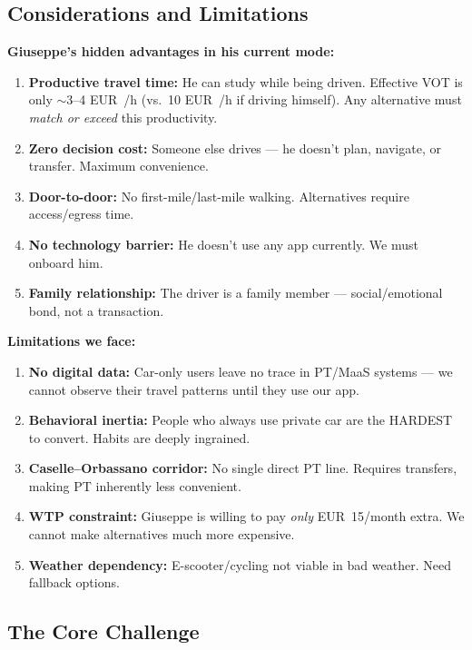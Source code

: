 \documentclass[11pt,a4paper]{article}
\begin{document}
\subsection{Considerations and Limitations}

\begin{tcolorbox}[colback=lightyellow,colframe=deeporange,title=\textbf{What We Must Consider}]
\textbf{Giuseppe's hidden advantages in his current mode:}
\begin{enumerate}[noitemsep]
    \item \textbf{Productive travel time:} He can study while being driven. Effective VOT is only $\sim$3--4 EUR~/h (vs.\ 10 EUR~/h if driving himself). Any alternative must \textit{match or exceed} this productivity.
    \item \textbf{Zero decision cost:} Someone else drives --- he doesn't plan, navigate, or transfer. Maximum convenience.
    \item \textbf{Door-to-door:} No first-mile/last-mile walking. Alternatives require access/egress time.
    \item \textbf{No technology barrier:} He doesn't use any app currently. We must onboard him.
    \item \textbf{Family relationship:} The driver is a family member --- social/emotional bond, not a transaction.
\end{enumerate}

\textbf{Limitations we face:}
\begin{enumerate}[noitemsep]
    \item \textbf{No digital data:} Car-only users leave no trace in PT/MaaS systems --- we cannot observe their travel patterns until they use our app.
    \item \textbf{Behavioral inertia:} People who always use private car are the HARDEST to convert. Habits are deeply ingrained.
    \item \textbf{Caselle--Orbassano corridor:} No single direct PT line. Requires transfers, making PT inherently less convenient.
    \item \textbf{WTP constraint:} Giuseppe is willing to pay \textit{only} EUR~15/month extra. We cannot make alternatives much more expensive.
    \item \textbf{Weather dependency:} E-scooter/cycling not viable in bad weather. Need fallback options.
\end{enumerate}
\end{tcolorbox}

\subsection{The Core Challenge}
\end{document}
